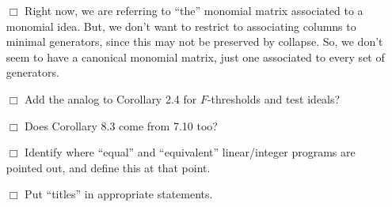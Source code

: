 \documentclass[11pt]{amsart}
\begin{document}
{\begin{itemize}
         \item[$\Box$] Right now, we are referring to ``the'' monomial matrix associated to a monomial idea.  But, we don't want to restrict to associating columns to minimal generators, since this may not be preserved by collapse.  So, we don't seem to have a canonical monomial matrix, just one associated to every set of generators.
      \item[$\Box$] Add the analog to Corollary 2.4 for $F$-thresholds and test ideals?
      \item[$\Box$] Does Corollary 8.3 come from 7.10 too?
      \item[$\Box$] Identify where ``equal'' and ``equivalent'' linear/integer programs are pointed out, and define this at that point.
    \item[$\Box$] Put ``titles'' in appropriate statements. 
   \end{itemize}
}



\newpage

\end{document}
